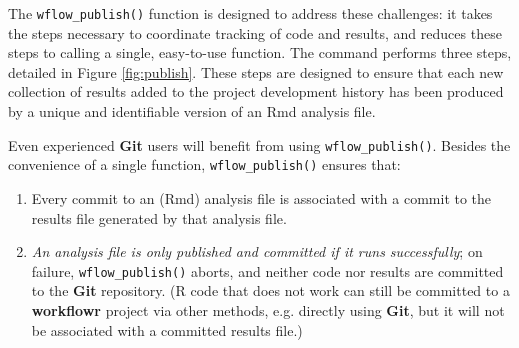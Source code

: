 \documentclass[9pt,a4paper]{extarticle}
\begin{document}
The \texttt{wflow\_publish()} function is designed to address these challenges: it
takes the steps necessary to coordinate tracking of code and results,
and reduces these steps to calling a single, easy-to-use function. The
command performs three steps, detailed in Figure \ref{fig:publish}. These steps are
designed to ensure that each new collection of results added to the
project development history has been produced by a unique and
identifiable version of an Rmd analysis file.

Even experienced \textbf{Git} users will benefit from using \texttt{wflow\_publish()}.
Besides the convenience of a single function, \texttt{wflow\_publish()} ensures
that:

\begin{enumerate}

\item Every commit to an (Rmd) analysis file is associated with a commit
to the results file generated by that analysis file.

\item \textit{An analysis file is only published and committed if it
runs successfully}; on failure, \texttt{wflow\_publish()} aborts, and neither code
nor results are committed to the \textbf{Git} repository. (R code that does not
work can still be committed to a \textbf{workflowr} project via other methods,
e.g. directly using \textbf{Git}, but it will not be associated with a committed
results file.)

\end{enumerate}
\end{document}
